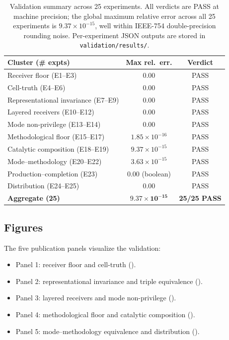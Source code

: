 \documentclass[twocolumn,11pt,a4paper]{article}
\begin{document}
\begin{table}[h!]\centering
\begin{tabular}{lcc}
\toprule
\textbf{Cluster (\# expts)} & \textbf{Max rel.\ err.} & \textbf{Verdict}\\\midrule
Receiver floor (E1--E3)              & $0.00$                       & PASS\\
Cell-truth (E4--E6)                  & $0.00$                       & PASS\\
Representational invariance (E7--E9) & $0.00$                       & PASS\\
Layered receivers (E10--E12)         & $0.00$                       & PASS\\
Mode non-privilege (E13--E14)        & $0.00$                       & PASS\\
Methodological floor (E15--E17)      & $1.85\times 10^{-16}$        & PASS\\
Catalytic composition (E18--E19)     & $9.37\times 10^{-15}$        & PASS\\
Mode--methodology (E20--E22)         & $3.63\times 10^{-15}$        & PASS\\
Production--completion (E23)         & $0.00$ (boolean)             & PASS\\
Distribution (E24--E25)              & $0.00$                       & PASS\\\midrule
\textbf{Aggregate (25)}              & $\mathbf{9.37\times 10^{-15}}$ & \textbf{25/25 PASS}\\\bottomrule
\end{tabular}
\caption{Validation summary across 25 experiments. All verdicts are PASS at
machine precision; the global maximum relative error across all 25
experiments is $9.37\times 10^{-15}$, well within IEEE-754
double-precision rounding noise. Per-experiment JSON outputs are stored in
\texttt{validation/results/}.}
\label{tab:validation}
\end{table}

\subsection{Figures}

The five publication panels visualize the validation:
\begin{itemize}[leftmargin=*]
\item Panel 1: receiver floor and cell-truth ().
\item Panel 2: representational invariance and triple equivalence
().
\item Panel 3: layered receivers and mode non-privilege
().
\item Panel 4: methodological floor and catalytic composition
().
\item Panel 5: mode--methodology equivalence and distribution
().
\end{itemize}
\end{document}

